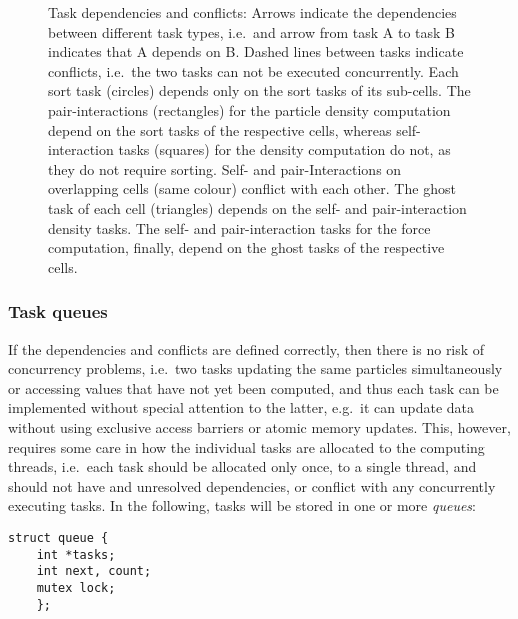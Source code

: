 \documentclass[final]{siamltex}
\begin{document}
\begin{figure}
    \centerline{}
    
    \caption{Task dependencies and conflicts:
        Arrows indicate the dependencies
        between different task types, i.e.~and arrow from task A to task
        B indicates that A depends on B.
        Dashed lines between tasks indicate conflicts, i.e.~the two tasks
        can not be executed concurrently.
        Each sort task (circles) depends
        only on the sort tasks of its sub-cells.
        The pair-interactions (rectangles) for the particle
        density computation depend on the sort tasks of the respective cells,
        whereas self-interaction tasks (squares) for the density computation
        do not, as they do not require sorting.
        Self- and pair-Interactions on overlapping cells (same colour)
        conflict with each other.
        The ghost task of each cell (triangles) depends on the self-
        and pair-interaction density tasks.
        The self- and pair-interaction tasks for the force computation, finally,
        depend on the ghost tasks of the respective cells.
        }
    \label{fig:Hierarchy2}
\end{figure}


\subsubsection{Task queues}

If the dependencies and conflicts are defined correctly, then
there is no risk of concurrency problems, i.e.~two tasks updating
the same particles simultaneously or accessing values that have
not yet been computed, and thus each task
can be implemented without special attention to the latter,
e.g.~it can update data without using exclusive access barriers
or atomic memory updates.
This, however, requires some care in how the individual tasks
are allocated to the computing threads, i.e.~each task should
be allocated only once, to a single thread, and should not have
and unresolved dependencies, or conflict with any concurrently
executing tasks.
In the following, tasks will be stored in one or more {\em queues}:
        
\begin{center}\begin{minipage}{0.8\textwidth}
    \begin{lstlisting}
struct queue {
    int *tasks;
    int next, count;
    mutex lock;
    };
    \end{lstlisting}
\end{minipage}\end{center}
\end{document}

